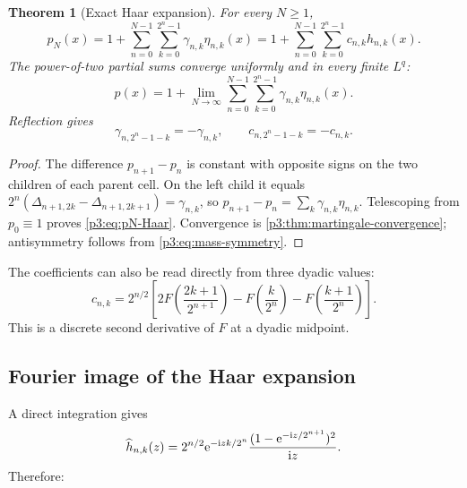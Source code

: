\documentclass[11pt]{article}
\newtheorem{theorem}{Theorem}[section]
\theoremstyle{definition}
\theoremstyle{remark}
\begin{document}
\begin{theorem}[Exact Haar expansion]
\label{p3:thm:Haar-expansion}
For every $N\ge1$,
\begin{equation}\label{p3:eq:pN-Haar}
 p_N(x)=1+\sum_{n=0}^{N-1}\sum_{k=0}^{2^n-1}
 \gamma_{n,k}\eta_{n,k}(x)
 =1+\sum_{n=0}^{N-1}\sum_{k=0}^{2^n-1}
 c_{n,k}h_{n,k}(x).
\end{equation}
The power-of-two partial sums converge uniformly and in every finite $L^q$:
\begin{equation}\label{p3:eq:p-Haar-limit}
 p(x)=1+\lim_{N\to\infty}
 \sum_{n=0}^{N-1}\sum_{k=0}^{2^n-1}\gamma_{n,k}\eta_{n,k}(x).
\end{equation}
Reflection gives
\begin{equation}\label{p3:eq:Haar-antisymmetry}
 \gamma_{n,2^n-1-k}=-\gamma_{n,k},
 \qquad
 c_{n,2^n-1-k}=-c_{n,k}.
\end{equation}
\end{theorem}

\begin{proof}
The difference $p_{n+1}-p_n$ is constant with opposite signs on the two
children of each parent cell.  On the left child it equals
$2^n(\Delta_{n+1,2k}-\Delta_{n+1,2k+1})=\gamma_{n,k}$,
so $p_{n+1}-p_n=\sum_k\gamma_{n,k}\eta_{n,k}$.  Telescoping from
$p_0\equiv1$ proves \eqref{p3:eq:pN-Haar}.  Convergence is
\cref{p3:thm:martingale-convergence}; antisymmetry follows from
\eqref{p3:eq:mass-symmetry}.
\end{proof}

The coefficients can also be read directly from three dyadic values:
\begin{equation}\label{p3:eq:c-three-values}
 c_{n,k}=2^{n/2}\left[
  2F\!\left(\frac{2k+1}{2^{n+1}}\right)
  -F\!\left(\frac{k}{2^n}\right)
  -F\!\left(\frac{k+1}{2^n}\right)
 \right].
\end{equation}
This is a discrete second derivative of $F$ at a dyadic midpoint.

\subsection{Fourier image of the Haar expansion}

A direct integration gives
\begin{equation}\label{p3:eq:Haar-transform}
 \widehat h_{n,k}(z)
 =2^{n/2}\mathrm e^{-\mathrm i zk/2^n}
 \frac{(1-\mathrm e^{-\mathrm i z/2^{n+1}})^2}{\mathrm i z}.
\end{equation}
Therefore:
\end{document}
